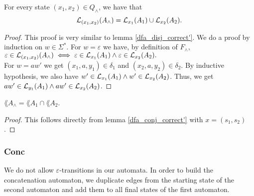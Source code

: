 \begin{lemma}
    \label{dfa_conj_correct'}
    For every state $(x_1, x_2) \in Q_\wedge$, we have that
    \begin{equation*}
        \mathcal{L}_{(x_1, x_2)}(A_\wedge) = \mathcal{L}_{x_1}(A_1) \cup \mathcal{L}_{x_2}(A_2).
    \end{equation*}
\end{lemma}
\begin{proof}
    This proof is very similar to lemma \ref{dfa_disj_correct'}.
    We do a proof by induction on $w \in \Sigma^*$.
    For $w = \varepsilon$ we have, by definition of $F_\wedge$, 
    $%
    \varepsilon \in \acc{(x_1, x_2)}{A_\wedge} 
    \iff \varepsilon \in \acc{x_1}{A_1} \wedge \varepsilon \in \acc{x_2}{A_2}.
    $%
    \\
    For $w = aw'$ we get $(x_1, a, y_1) \in \delta_1$ and $(x_2, a, y_2) \in \delta_2$.
    By inductive hypothesis, we also have $w' \in \mathcal{L}_{x_1}(A_1) \wedge w' \in \mathcal{L}_{x_2}(A_2)$.
    Thus, we get $aw' \in \mathcal{L}_{y_1}(A_1) \wedge aw' \in \mathcal{L}_{x_2}(A_2)$.
\end{proof}

\begin{lemma}
    $\lang{A_\wedge} = \lang{A_1} \cap \lang{A_2}$.
    \label{dfa_conj_correct}
\end{lemma}
\begin{proof}
    This follows directly from lemma \ref{dfa_conj_correct'} with $x = (s_1, s_2)$.
\end{proof}




\subsubsection{Conc}
We do not allow $\varepsilon$-transitions in our automata. 
In order to build the concatenation automaton, we duplicate edges from
the starting state of the second automaton and add them to all final states 
of the first automaton.

